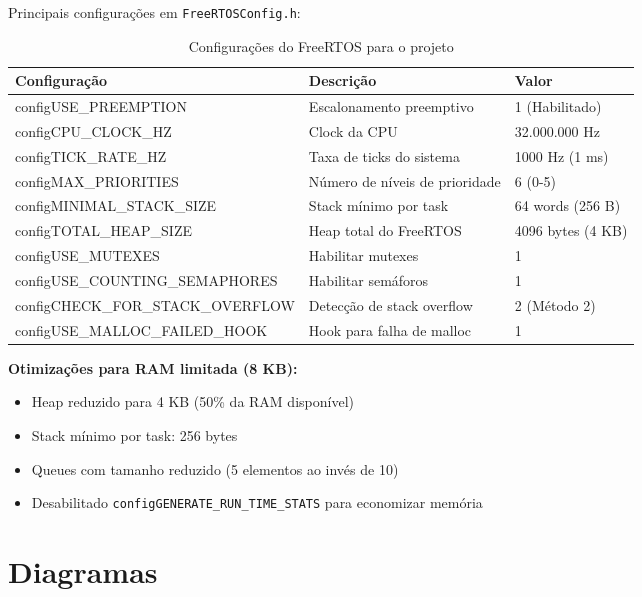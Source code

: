 \documentclass[12pt,a4paper]{article}
\begin{document}
Principais configurações em \texttt{FreeRTOSConfig.h}:

\begin{table}[H]
\centering
\begin{tabularx}{\textwidth}{lXl}
\toprule
\textbf{Configuração} & \textbf{Descrição} & \textbf{Valor} \\
\midrule
configUSE\_PREEMPTION & Escalonamento preemptivo & 1 (Habilitado) \\
configCPU\_CLOCK\_HZ & Clock da CPU & 32.000.000 Hz \\
configTICK\_RATE\_HZ & Taxa de ticks do sistema & 1000 Hz (1 ms) \\
configMAX\_PRIORITIES & Número de níveis de prioridade & 6 (0-5) \\
configMINIMAL\_STACK\_SIZE & Stack mínimo por task & 64 words (256 B) \\
configTOTAL\_HEAP\_SIZE & Heap total do FreeRTOS & 4096 bytes (4 KB) \\
configUSE\_MUTEXES & Habilitar mutexes & 1 \\
configUSE\_COUNTING\_SEMAPHORES & Habilitar semáforos & 1 \\
configCHECK\_FOR\_STACK\_OVERFLOW & Detecção de stack overflow & 2 (Método 2) \\
configUSE\_MALLOC\_FAILED\_HOOK & Hook para falha de malloc & 1 \\
\bottomrule
\end{tabularx}
\caption{Configurações do FreeRTOS para o projeto}
\end{table}

\textbf{Otimizações para RAM limitada (8 KB):}

\begin{itemize}
    \item Heap reduzido para 4 KB (50\% da RAM disponível)
    \item Stack mínimo por task: 256 bytes
    \item Queues com tamanho reduzido (5 elementos ao invés de 10)
    \item Desabilitado \texttt{configGENERATE\_RUN\_TIME\_STATS} para economizar memória
\end{itemize}

\section{Diagramas}
\end{document}
